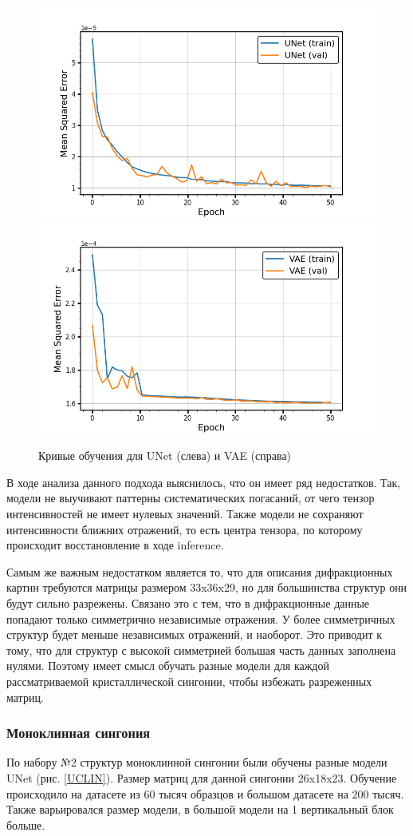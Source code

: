 \documentclass[a4paper,12pt]{article}
\begin{document}
{\begin{figure}[ht!]
            \includegraphics[width=.5\textwidth]{UNet_all.png}\hfill
            \includegraphics[width=.5\textwidth]{VAE_all.png}
            \caption{Кривые обучения для UNet (слева) и VAE (справа)}
            \label{UVAE_ALL}
\end{figure}

В ходе анализа данного подхода выяснилось, что он имеет ряд недостатков. Так, модели не выучивают паттерны систематических погасаний, от чего тензор интенсивностей не имеет нулевых значений. Также модели не сохраняют интенсивности ближних отражений, то есть центра тензора, по которому происходит восстановление в ходе inference. 

Самым же важным недостатком является то, что для описания дифракционных картин требуются матрицы размером 33x36x29, но для большинства структур они будут сильно разрежены. Связано это с тем, что в дифракционные данные попадают только симметрично независимые отражения. У более симметричных структур будет меньше независимых отражений, и наоборот. Это приводит к тому, что для структур с высокой симметрией большая часть  данных заполнена нулями. Поэтому имеет смысл обучать разные модели для каждой рассматриваемой кристаллической сингонии, чтобы избежать разреженных матриц.

\subsubsection*{Моноклинная сингония}

По набору №2 структур моноклинной сингонии были обучены разные модели UNet (рис. \ref{UCLIN}). Размер матриц для данной сингонии 26x18x23. Обучение происходило на датасете из 60 тысяч образцов и большом датасете на 200 тысяч. Также варьировался размер модели, в большой модели на 1 вертикальный блок больше.

}
\end{document}
